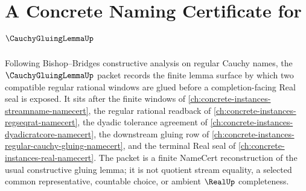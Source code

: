 \chapter{A Concrete Naming Certificate for $\CauchyGluingLemmaUp$}
\label{ch:concrete-instances-cauchy-gluing-lemma-namecert}

Following Bishop--Bridges constructive analysis on regular Cauchy names, the $\CauchyGluingLemmaUp$ packet records the finite lemma surface by which two compatible regular rational windows are glued before a completion-facing Real seal is exposed. It sits after the finite windows of \autoref{ch:concrete-instances-streamname-namecert}, the regular rational readback of \autoref{ch:concrete-instances-regseqrat-namecert}, the dyadic tolerance agreement of \autoref{ch:concrete-instances-dyadicratcore-namecert}, the downstream gluing row of \autoref{ch:concrete-instances-regular-cauchy-gluing-namecert}, and the terminal Real seal of \autoref{ch:concrete-instances-real-namecert}. The packet is a finite NameCert reconstruction of the usual constructive gluing lemma; it is not quotient stream equality, a selected common representative, countable choice, or ambient $\RealUp$ completeness.

